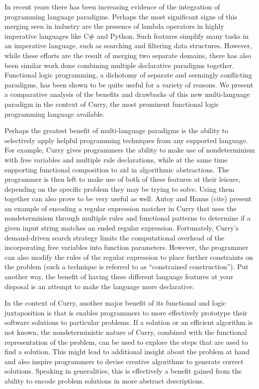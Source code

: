 \documentclass[12pt,letterpaper]{article}
\begin{document}
In recent years there has been increasing evidence of the integration of programming language paradigms.
Perhaps the most significant signs of this merging seen in industry are the presence of lambda 
operators in highly imperative languages like C\# and Python. Such features simplify many tasks in an
imperative language, such as searching and filtering data structures. However, while these efforts are the result of merging two separate domains, there has also been similar work done combining multiple 
declarative paradigms together. Functional logic programming, a dichotomy of separate and seemingly 
conflicting paradigms, has been shown to be quite useful for a variety of reasons. We present a
comparative analysis of the benefits and drawbacks of this new multi-language paradigm in the context of
Curry, the most prominent functional logic programming language available.

Perhaps the greatest benefit of multi-language paradigms is the ability to selectively apply helpful 
programming techniques from any supported language. For example, Curry gives programmers the ability to 
make use of nondeterminism with free variables and multiple rule declarations, while at the same time 
supporting functional composition to aid in algorithmic abstractions. The programmer is then left to 
make use of both of these features at their leisure, depending on the specific problem they may be 
trying to solve. Using them together can also prove to be very useful as well. Antoy and Hanus (cite) 
present an example of encoding a regular expression matcher in Curry that uses the nondeterminism through
multiple rules and functional patterns to determine if a given input string matches an ended regular 
expression. Fortunately, Curry's demand-driven search strategy limits the computational overhead of 
the incorporating free variables into function parameters. However, the programmer can also modify
the rules of the regular expression to place further constraints on the problem (such a technique is 
referred to as ``constrained construction''). Put another way, the benefit of having these different 
language features at your disposal is an attempt to make the language more declarative. 

In the context of Curry, another major benefit of its functional and logic juxtaposition is that 
is enables programmers to more effectively prototype their software solutions to particular problems.
If a solution or an efficient algorithm is not known, the nondeterministic nature of Curry, combined
with the functional representation of the problem, can be used to explore the steps that are used
to find a solution. This might lead to additional insight about the problem at hand and also inspire
programmers to devise creative algorithms to generate correct solutions. Speaking in generalities, 
this is effectively a benefit gained from the ability to encode problem solutions in more abstract 
descriptions.
\end{document}

